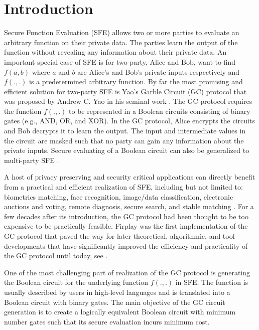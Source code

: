 \chapter{Introduction}
Secure Function Evaluation (SFE) allows two or more parties to evaluate an arbitrary function on their private data.
The parties learn the output of the function without revealing any information about their private data.
An important special case of SFE is for two-party, Alice and Bob, want to find $f(a, b)$ where $a$ and $b$ are Alice's and Bob's private inputs respectively and $f(., .)$ is a predetermined arbitrary function.
By far the most promising and efficient solution for two-party SFE is Yao's Garble Circuit (GC) protocol that was proposed by Andrew C. Yao in his seminal work \cite{yao1986generate}.
The GC protocol requires the function $f(., .)$ to be represented in a Boolean circuits consisting of binary gates (e.g., AND, OR, and XOR).
In the GC protocol, Alice encrypts the circuits and Bob decrypts it to learn the output.
The input and intermediate values in the circuit are masked such that no party can gain any information about the private inputs.
Secure evaluating of a Boolean circuit can also be generalized to multi-party SFE \cite{goldreich1987play, ben2008fairplaymp}.

A host of privacy preserving and security critical applications can directly benefit from a practical and efficient realization of SFE, including but not limited to: biometrics matching, face recognition, image/data classification, electronic auctions and voting, remote diagnosis, secure search, and stable matching \cite{riazi2017toward, zhang2016robust, bringer2013privacy, evans2011efficient, barni2009secure, naor1999privacy, brickell2007privacy, jha2008towards}.
For a few decades after its introduction, the GC protocol had been thought to be too expensive to be practically feasible.
Firplay \cite{malkhi2004fairplay} was the first implementation of the GC protocol that paved the way for later theoretical, algorithmic, and tool developments that have significantly improved the efficiency and practicality of the GC protocol until today, see \cite{malkhi2004fairplay, kolesnikov2008improved, pinkas2009secure, huang2011faster, bellare2013efficient, zahur2015two, zahur2015obliv, liu2015oblivm}.

One of the most challenging part of realization of the GC protocol is generating the Boolean circuit for the underlying function $f(., .)$ in SFE.
The function is usually described by users in high-level languages and is translated into a Boolean circuit with binary gates.
The main objective of the GC circuit generation is to create a logically equivalent Boolean circuit with minimum number gates such that its secure evaluation incurs minimum cost.

